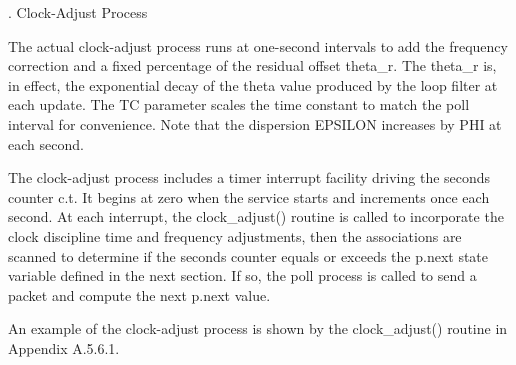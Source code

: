 
.  Clock-Adjust Process

   The actual clock-adjust process runs at one-second intervals to add
   the frequency correction and a fixed percentage of the residual
   offset theta_r.  The theta_r is, in effect, the exponential decay of
   the theta value produced by the loop filter at each update.  The TC
   parameter scales the time constant to match the poll interval for
   convenience.  Note that the dispersion EPSILON increases by PHI at
   each second.

   The clock-adjust process includes a timer interrupt facility driving
   the seconds counter c.t.  It begins at zero when the service starts
   and increments once each second.  At each interrupt, the
   clock_adjust() routine is called to incorporate the clock discipline
   time and frequency adjustments, then the associations are scanned to
   determine if the seconds counter equals or exceeds the p.next state
   variable defined in the next section.  If so, the poll process is
   called to send a packet and compute the next p.next value.

   An example of the clock-adjust process is shown by the clock_adjust()
   routine in Appendix A.5.6.1.
